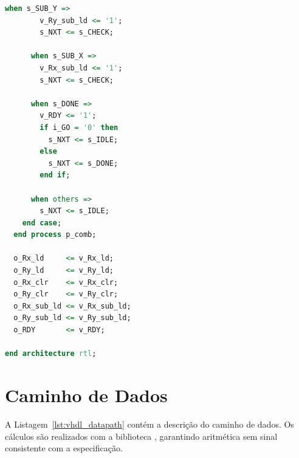 \documentclass[12pt,oneside,openright,a4paper,brazil]{abntex2}
\newcommand{\code}[1]{\texttt{\detokenize{#1}}}
\begin{document}
\begin{lstlisting}[language=VHDL, caption={Implementação da FSM de controle}, label={lst:vhdl_control}]
      when s_SUB_Y =>
        v_Ry_sub_ld <= '1';
        s_NXT <= s_CHECK;

      when s_SUB_X =>
        v_Rx_sub_ld <= '1';
        s_NXT <= s_CHECK;

      when s_DONE =>
        v_RDY <= '1';
        if i_GO = '0' then
          s_NXT <= s_IDLE;
        else
          s_NXT <= s_DONE;
        end if;

      when others =>
        s_NXT <= s_IDLE;
    end case;
  end process p_comb;

  o_Rx_ld     <= v_Rx_ld;
  o_Ry_ld     <= v_Ry_ld;
  o_Rx_clr    <= v_Rx_clr;
  o_Ry_clr    <= v_Ry_clr;
  o_Rx_sub_ld <= v_Rx_sub_ld;
  o_Ry_sub_ld <= v_Ry_sub_ld;
  o_RDY       <= v_RDY;

end architecture rtl;
\end{lstlisting}

\section{Caminho de Dados}
A Listagem~\ref{lst:vhdl_datapath} contém a descrição do caminho de dados. Os cálculos são realizados com a biblioteca \code{numeric_std}, garantindo aritmética sem sinal consistente com a especificação.
\end{document}
